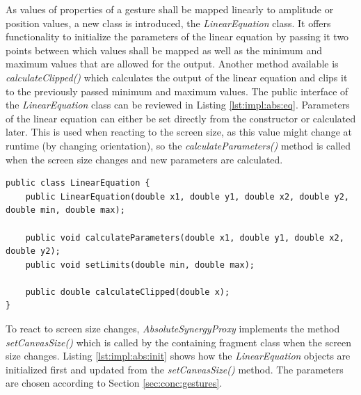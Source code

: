 As values of properties of a gesture shall be mapped linearly to amplitude or position values, a new class is introduced, the \textit{LinearEquation} class. It offers functionality to initialize the parameters of the linear equation by passing it two points between which values shall be mapped as well as the minimum and maximum values that are allowed for the output. Another method available is \textit{calculateClipped()} which calculates the output of the linear equation and clips it to the previously passed minimum and maximum values. The public interface of the \textit{LinearEquation} class can be reviewed in Listing \ref{lst:impl:abs:eq}. Parameters of the linear equation can either be set directly from the constructor or calculated later. This is used when reacting to the screen size, as this value might change at runtime (by changing orientation), so the \textit{calculateParameters()} method is called when the screen size changes and new parameters are calculated.

\begin{lstlisting}[caption={Public interface of the LinearEquation class},label=lst:impl:abs:eq]
public class LinearEquation {
	public LinearEquation(double x1, double y1, double x2, double y2, double min, double max);
	
	public void calculateParameters(double x1, double y1, double x2, double y2);
	public void setLimits(double min, double max);
	
	public double calculateClipped(double x);
}
\end{lstlisting}

To react to screen size changes, \textit{AbsoluteSynergyProxy} implements the method \textit{setCanvasSize()} which is called by the containing fragment class when the screen size changes. Listing \ref{lst:impl:abs:init} shows how the \textit{LinearEquation} objects are initialized first and updated from the \textit{setCanvasSize()} method. The parameters are chosen according to Section \ref{sec:conc:gestures}.

